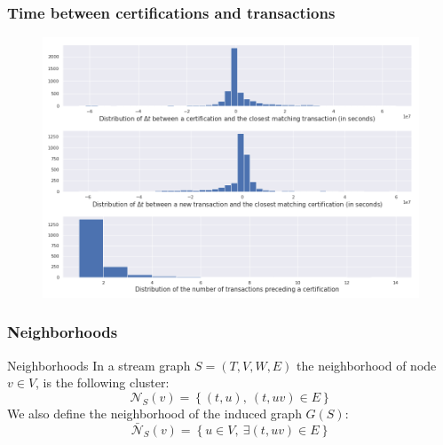 \documentclass{beamer}
\begin{document}
\begin{frame}
\begin{center}
\begin{figure}
		\end{figure}
	\end{center}
\end{frame}



\begin{frame}
	\frametitle{Time between certifications and transactions}
	\begin{figure}
		\includegraphics[width=.9\linewidth]{./figures/delta_t}
	\end{figure}
\end{frame}


\begin{frame}
	\frametitle{Neighborhoods}
	\begin{block}{Neighborhoods}
		In a stream graph $S = \left(T, V, W, E \right)$ the neighborhood of node $ v \in V$, is the following cluster: 				 \[\mathcal{N}_S \left(v \right) = \left\{ \left(t, u \right),\  \left(t, uv \right) \in E \right\} \]
		We also define the neighborhood of the induced graph $ G \left(S \right)$: 
		\[ \bar{\mathcal{N}}_{S} \left(v \right) = \left\{ u \in V,\ \exists \left(t, uv \right) \in E \right\} \]
	\end{block}
\end{frame}
\end{document}
